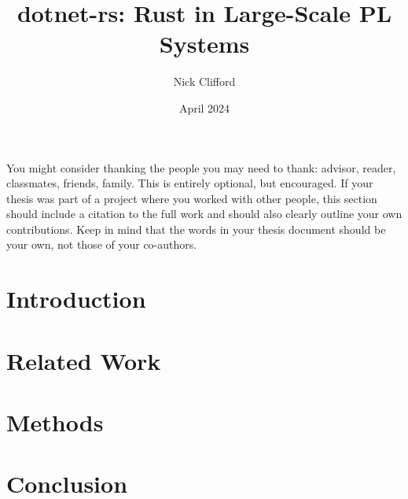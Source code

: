 \documentclass{ucetd}
\title{dotnet-rs: Rust in Large-Scale PL Systems}
\author{Nick Clifford}
\date{April 2024}
\begin{document}
\maketitle

\makecopyright


\tableofcontents

\acknowledgments
You might consider thanking the people you may need to thank: advisor, reader, classmates, friends, family. This is entirely optional, but encouraged. If your thesis was part of a project where you worked with other people, this section should include a citation to the full work and should also clearly outline your own contributions. Keep in mind that the words in your thesis document should be your own, not those of your co-authors.

\abstract


\mainmatter

\chapter{Introduction}


\chapter{Related Work}


\chapter{Methods}


\chapter{Conclusion}


\makebibliography

%
%

%
%
\end{document}
